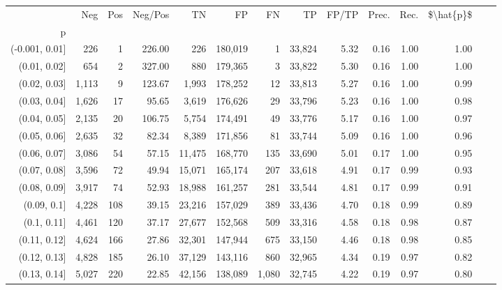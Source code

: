 \begin{tabular}{rrrrrrrrrrrrrr}
\toprule
{} &    Neg &  Pos & Neg/Pos &       TN &       FP &      FN &      TP & FP/TP & Prec. &  Rec. & \$\textbackslash hat\{p\}\$ \\
p              &        &      &         &          &          &         &         &       &       &       &           \\
\midrule
(-0.001, 0.01] &    226 &    1 &  226.00 &      226 &  180,019 &       1 &  33,824 &  5.32 &  0.16 &  1.00 &      1.00 \\
(0.01, 0.02]   &    654 &    2 &  327.00 &      880 &  179,365 &       3 &  33,822 &  5.30 &  0.16 &  1.00 &      1.00 \\
(0.02, 0.03]   &  1,113 &    9 &  123.67 &    1,993 &  178,252 &      12 &  33,813 &  5.27 &  0.16 &  1.00 &      0.99 \\
(0.03, 0.04]   &  1,626 &   17 &   95.65 &    3,619 &  176,626 &      29 &  33,796 &  5.23 &  0.16 &  1.00 &      0.98 \\
(0.04, 0.05]   &  2,135 &   20 &  106.75 &    5,754 &  174,491 &      49 &  33,776 &  5.17 &  0.16 &  1.00 &      0.97 \\
(0.05, 0.06]   &  2,635 &   32 &   82.34 &    8,389 &  171,856 &      81 &  33,744 &  5.09 &  0.16 &  1.00 &      0.96 \\
(0.06, 0.07]   &  3,086 &   54 &   57.15 &   11,475 &  168,770 &     135 &  33,690 &  5.01 &  0.17 &  1.00 &      0.95 \\
(0.07, 0.08]   &  3,596 &   72 &   49.94 &   15,071 &  165,174 &     207 &  33,618 &  4.91 &  0.17 &  0.99 &      0.93 \\
(0.08, 0.09]   &  3,917 &   74 &   52.93 &   18,988 &  161,257 &     281 &  33,544 &  4.81 &  0.17 &  0.99 &      0.91 \\
(0.09, 0.1]    &  4,228 &  108 &   39.15 &   23,216 &  157,029 &     389 &  33,436 &  4.70 &  0.18 &  0.99 &      0.89 \\
(0.1, 0.11]    &  4,461 &  120 &   37.17 &   27,677 &  152,568 &     509 &  33,316 &  4.58 &  0.18 &  0.98 &      0.87 \\
(0.11, 0.12]   &  4,624 &  166 &   27.86 &   32,301 &  147,944 &     675 &  33,150 &  4.46 &  0.18 &  0.98 &      0.85 \\
(0.12, 0.13]   &  4,828 &  185 &   26.10 &   37,129 &  143,116 &     860 &  32,965 &  4.34 &  0.19 &  0.97 &      0.82 \\
(0.13, 0.14]   &  5,027 &  220 &   22.85 &   42,156 &  138,089 &   1,080 &  32,745 &  4.22 &  0.19 &  0.97 &      0.80 \\

\end{tabular}
